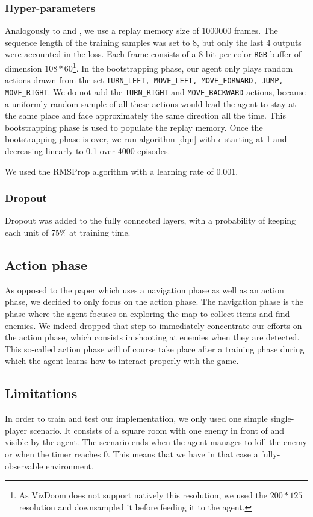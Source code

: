 \documentclass[letterpaper]{article}
\begin{document}
\subsubsection{Hyper-parameters}
Analogously to \cite{Mnih2015} and \cite{Lample2016}, we use a replay memory
size of $1000000$ frames. The sequence length of
the training samples was set to 8, but only the last 4 outputs were accounted
in the loss.
Each frame consists of a 8 bit per color \texttt{RGB} buffer of dimension
$108 * 60$\footnote{As VizDoom does not support natively this resolution, we
used the $200 * 125$ resolution and downsampled it before feeding it to the
agent.}.
In the bootstrapping phase, our agent only plays random actions drawn from the
set \texttt{TURN\_LEFT, MOVE\_LEFT, MOVE\_FORWARD, JUMP, MOVE\_RIGHT}. We do
not add the \texttt{TURN\_RIGHT} and \texttt{MOVE\_BACKWARD} actions, because
a uniformly random sample of all these actions would lead the agent to stay
at the same place and face approximately the same direction all the time. This
bootstrapping phase is used to populate the replay memory. Once the
bootstrapping phase is over, we run algorithm \ref{dqn} with $\epsilon$ starting at
1 and decreasing linearly to 0.1 over 4000 episodes.

We used the RMSProp \citep{rmsprop} algorithm with a learning rate of 0.001.

\subsubsection{Dropout}
Dropout \citep{Srivastava2014} was added to the fully connected layers, with
a probability of keeping each unit of 75\% at training time.

\subsection{Action phase}
As opposed to the paper \citep{Lample2016} which uses a navigation phase as
well as an action phase, we decided to only focus on the action phase. The
navigation phase is the phase where the agent focuses on exploring the map to
collect items and find enemies. We indeed dropped that step to immediately
concentrate our efforts on the action phase, which consists in shooting at
enemies when they are detected. This so-called action phase will of course
take place after a training phase during which the agent learns how to interact
properly with the game.

\subsection{Limitations} In order to train and test our implementation, we only
used one simple single-player scenario. It consists of a square room with one
enemy in front of and visible by the agent. The scenario ends when the agent
manages to kill the enemy or when the timer reaches 0. This means that we have
in that case a fully-observable environment.\todo{}
\end{document}
